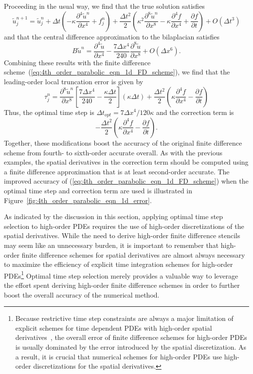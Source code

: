 \documentclass[fleqn,12pt,twoside]{article}
\newcommand{\beq}{\begin{equation}}
\newcommand{\eeq}{\end{equation}}
\def\pt{\partial t}
\def\px{\partial x}
\def\tu{\tilde{u}}
\def\dt{\Delta t}
\def\dx{\Delta x}
\def\dto{\dt_{opt}}
\begin{document}
Proceeding in the usual way, we find that the true solution satisfies
\beq
  \tu^{n+1}_j = \tu^{n}_j 
  + \dt \left( -\kappa \frac{\partial^4 \tu^n}{\px^4}  
             + f^n_j
        \right)
  + \frac{\dt^2}{2} 
    \left(
      \kappa^2 \frac{\partial^8 \tu^n}{\px^8} 
    - \kappa \frac{\partial^4 f}{\px^4} 
    + \frac{\partial f}{\pt}
    \right)
  + O \left( \dt^3 \right)
  \label{eq:4th_order_parabolic_eqn_1d_time_err}
\eeq
and that the central difference approximation to the bilaplacian satisfies
\beq
  B \tu^n = \frac{\partial^4 \tu}{\px^4} 
  - \frac{7 \dx^4}{240} 
    \frac{\partial^8 \tu}{\px^8} 
  + O(\dx^6)
  \label{eq:4th_order_parabolic_eqn_1d_space_err}.
\eeq
Combining these results with the finite difference 
scheme~(\ref{eq:4th_order_parabolic_eqn_1d_FD_scheme}), we find that the
leading-order local truncation error is given by
\beq
  \tau^n_j = 
     \frac{\partial^8 \tu^n}{\px^8} 
    \left[ \frac{7 \dx^4}{240} - \frac{\kappa \dt}{2}  \right] (\kappa \dt)
    + \frac{\dt^2}{2} 
        \left( \kappa \frac{\partial^4 f}{\px^4} 
             - \frac{\partial f}{\pt}
        \right)
  \label{eq:4th_order_parabolic_eqn_1d_err_eqn}
\eeq
Thus, the optimal time step is $\dto = 7 \dx^4/120\kappa$ and the correction
term is 
\beq
  - \frac{\dt^2}{2} 
      \left( \kappa \frac{\partial^4 f}{\px^4} 
           - \frac{\partial f}{\pt}
      \right).
\eeq
Together, these modifications boost the accuracy of the original
finite difference scheme from fourth- to sixth-order accurate 
overall.  As with the previous examples, the spatial derivatives in the 
correction term should be computed using a finite difference approximation 
that is at least second-order accurate.  
The improved accuracy of (\ref{eq:4th_order_parabolic_eqn_1d_FD_scheme}) 
when the optimal time step and correction term are used is illustrated in 
Figure~\ref{fig:4th_order_parabolic_eqn_1d_error}. 

As indicated by the discussion in this section, applying optimal time step 
selection to high-order PDEs requires the use of high-order discretizations
of the spatial derivatives.  While the need to derive high-order finite 
difference stencils may seem like an unnecessary burden, it is important
to remember that high-order finite difference schemes for spatial derivatives
are almost always necessary to maximize the efficiency of explicit time
integration schemes for high-order PDEs\footnote{Because restrictive time 
step constraints are always a major limitation of explicit schemes for 
time dependent PDEs with high-order spatial 
derivatives~\cite{gko_book,greer_2006}, 
the overall error of finite difference schemes for high-order PDEs is usually 
dominated by the error introduced by the spatial discretization.  As a result, 
it is crucial that numerical schemes for high-order PDEs use high-order 
discretizations for the spatial derivatives.}
Optimal time step selection merely provides a valuable way to leverage the 
effort spent deriving high-order finite difference schemes in order to further 
boost the overall accuracy of the numerical method.
\end{document}
